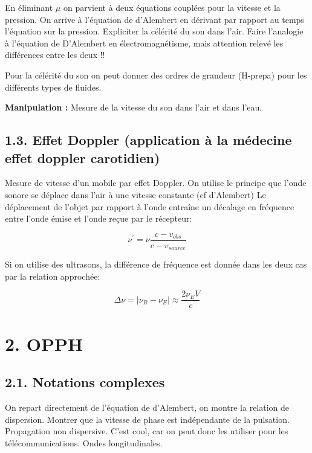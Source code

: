 \documentclass[french, a4paper, 10pt, twocolumn, landscape]{article}
\begin{document}
En éliminant $\mu$ on parvient à deux équations couplées pour la vitesse et la pression. On arrive à l'équation de d'Alembert en dérivant par rapport au temps l'équation sur la pression. Expliciter la célérité du son dans l'air. Faire l'analogie à l'équation de D'Alembert en électromagnétisme, mais attention relevé les différences entre les deux !!

Pour la célérité du son on peut donner des ordres de grandeur (H-prepa) pour les différents types de fluides. 

\textbf{Manipulation : } Mesure de la vitesse du son dans l'air et dans l'eau.

\subsection*{1.3. Effet Doppler (application à la médecine effet doppler carotidien)}

Mesure de vitesse d'un mobile par effet Doppler. On utilise le principe que l'onde sonore se déplace dans l'air à une vitesse constante (cf d'Alembert) Le déplacement de l'objet par rapport à l'onde entraîne un décalage en fréquence entre l'onde émise et l'onde reçue par le récepteur:

\begin{equation}
  \nu^\prime = \nu \dfrac{c-v_{obs}}{c-v_{source}}
\end{equation}

Si on utilise des ultrasons, la différence de fréquence est donnée dans les deux cas par la relation approchée: 

\begin{equation}
  \Delta\nu = |\nu_R-\nu_E|\approx \dfrac{2\nu_E V}{c}
\end{equation}

\section*{2. OPPH}

\subsection*{2.1. Notations complexes}

On repart directement de l'équation de d'Alembert, on montre la relation de dispersion.
Montrer que la vitesse de phase est indépendante de la pulsation. Propagation non dispersive. C'est cool, car on peut donc les utiliser pour les télécommunications. Ondes longitudinales. 
\end{document}
